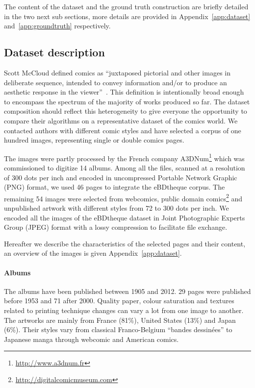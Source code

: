 The content of the dataset and the ground truth construction are briefly detailed in the two next sub sections, more details are provided in Appendix~\ref{app:dataset} and~\ref{app:groundtruth} respectively.



\subsection{Dataset description} %
\label{sec:dataset_description}


Scott McCloud defined comics as ``juxtaposed pictorial and other images in deliberate sequence, intended to convey information and/or to produce an aesthetic response in the viewer''~\cite{mccloud1994understanding}.
This definition is intentionally broad enough to encompass the spectrum of the majority of works produced so far.
The dataset composition should reflect this heterogeneity to give everyone the opportunity
to compare their algorithms on a representative dataset of the comics world.
We contacted authors with different comic styles and have selected a corpus of one hundred images, representing single or double comics pages.

The images were partly processed by the French company A3DNum\footnote{\url{http://www.a3dnum.fr}} which was commissioned to digitize 14 albums.
Among all the files, scanned at a resolution of 300 dots per inch and encoded in uncompressed Portable Network Graphic (PNG) format, we used 46 pages to integrate the eBDtheque corpus.
The remaining 54 images were selected from webcomics, public domain comics\footnote{\url{http://digitalcomicmuseum.com}} and unpublished artwork with different styles from 72 to 300 dots per inch.
We encoded all the images of the eBDtheque dataset in Joint Photographic Experts Group (JPEG) format with a lossy compression to facilitate file exchange.

Hereafter we describe the characteristics of the selected pages and their content, an overview of the images is given Appendix~\ref{app:dataset}.

\paragraph{Albums} %
 \label{par:albums}
 The albums have been published between 1905 and 2012.
 29 pages were published before 1953 and 71 after 2000.
 Quality paper, colour saturation and textures related to printing technique changes can vary a lot from one image to another.
 The artworks are mainly from France (81\%), United States (13\%) and Japan (6\%).
 Their styles vary from classical Franco-Belgium ``bandes dessinées'' to Japanese manga through webcomic and American comics.

